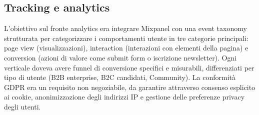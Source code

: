 \subsection{Tracking e analytics}
L'obiettivo sul fronte analytics era integrare Mixpanel con una event 
taxonomy strutturata per categorizzare i comportamenti utente in tre 
categorie principali: page view (visualizzazioni), interaction 
(interazioni con elementi della pagina) e conversion (azioni di valore 
come submit form o iscrizione newsletter). Ogni verticale doveva avere 
funnel di conversione specifici e misurabili, differenziati per tipo di 
utente (B2B enterprise, B2C candidati, Community). La conformità GDPR 
era un requisito non negoziabile, da garantire attraverso consenso 
esplicito ai cookie, anonimizzazione degli indirizzi IP e gestione 
delle preferenze privacy degli utenti.